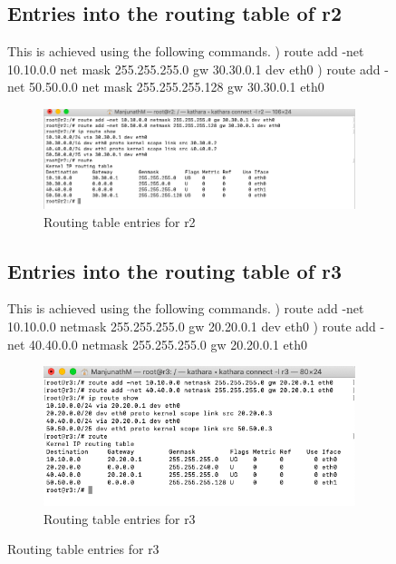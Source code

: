 \begin{figure}[H]
\subsection{Entries into the routing table of r2}
This is achieved using the following commands.
) route add -net 10.10.0.0 net mask 255.255.255.0 gw 30.30.0.1 dev eth0
) route add -net 50.50.0.0 net mask 255.255.255.128 gw 30.30.0.1 eth0
\begin{figure}[H]
\centering
  \includegraphics[width=400pt]{Images/routing_tableEntries_r2.png}
  \caption{Routing table entries for r2}
  \label{fig:2.6.1}
\end{figure}

\subsection{Entries into the routing table of r3}
This is achieved using the following commands.
) route add -net 10.10.0.0 netmask 255.255.255.0 gw 20.20.0.1 dev eth0
) route add -net 40.40.0.0 netmask 255.255.255.0 gw 20.20.0.1 eth0
\begin{figure}[H]
\centering
  \includegraphics[width=400pt]{Images/routing_tableEntries_r3.png}
  \caption{Routing table entries for r3}
  \label{fig:2.6.2}
\end{figure}


\end{figure}
